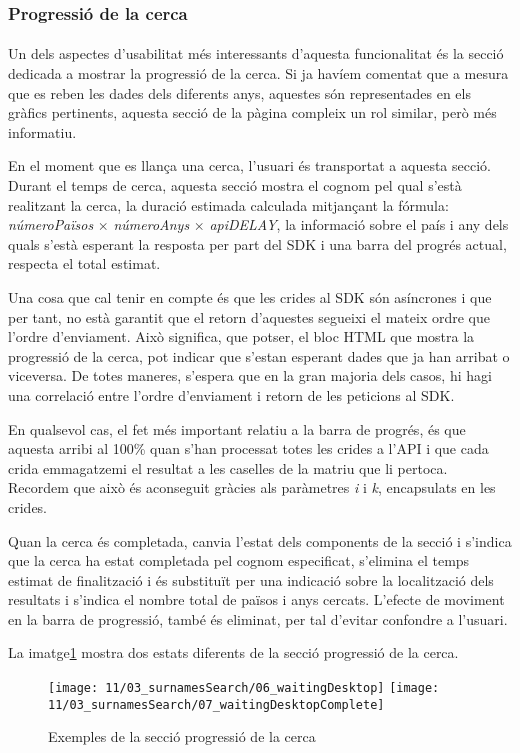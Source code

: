 \subsubsection{Progressió de la cerca}

\paragraph{}
Un dels aspectes d'usabilitat més interessants d'aquesta funcionalitat és la secció dedicada a mostrar la progressió de la cerca. Si ja havíem comentat que a mesura que es reben les dades dels diferents anys, aquestes són representades en els gràfics pertinents, aquesta secció de la pàgina compleix un rol similar, però més informatiu.

En el moment que es llança una cerca, l'usuari és transportat a aquesta secció. Durant el temps de cerca, aquesta secció mostra el cognom pel qual s'està realitzant la cerca, la duració estimada calculada mitjançant la fórmula: \emph{númeroPaïsos} $\times$ \emph{númeroAnys} $\times$ \emph{apiDELAY}, la informació sobre el país i any dels quals s'està esperant la resposta per part del SDK i una barra del progrés actual, respecta el total estimat.

Una cosa que cal tenir en compte és que les crides al SDK són asíncrones i que per tant, no està garantit que el retorn d'aquestes segueixi el mateix ordre que l'ordre d'enviament. Això significa, que potser, el bloc HTML que mostra la progressió de la cerca, pot indicar que s’estan esperant dades que ja han arribat o viceversa. De totes maneres, s’espera que en la gran majoria dels casos, hi hagi una correlació entre l’ordre d’enviament i retorn de les peticions al SDK.

En qualsevol cas, el fet més important relatiu a la barra de progrés, és que aquesta arribi al 100\% quan s'han processat totes les crides a l’API i que cada crida emmagatzemi el resultat a les caselles de la matriu que li pertoca. Recordem que això és aconseguit gràcies als paràmetres \emph{i} i \emph{k}, encapsulats en les crides.

Quan la cerca és completada, canvia l'estat dels components de la secció i s'indica que la cerca ha estat completada pel cognom especificat, s'elimina el temps estimat de finalització i és substituït per una indicació sobre la localització dels resultats i s'indica el nombre total de països i anys cercats. L'efecte de moviment en la barra de progressió, també és eliminat, per tal d'evitar confondre a l'usuari.

La imatge\ref{fig:waitingSurnames} mostra dos estats diferents de la secció progressió de la cerca.

\begin{figure}
    \texttt{[image: 11/03\_surnamesSearch/06\_waitingDesktop]}
    \texttt{[image: 11/03\_surnamesSearch/07\_waitingDesktopComplete]}
    \centering
    \caption{Exemples de la secció progressió de la cerca}\label{fig:waitingSurnames}
\end{figure}
